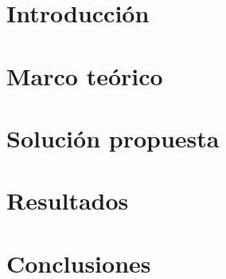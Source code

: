 \documentclass[letterpaper,journal]{IEEEtran}
\begin{document}
\section{Introducción}


\section{Marco teórico}




\section{Solución propuesta}








\section{Resultados}






\section{Conclusiones}










\end{document}
